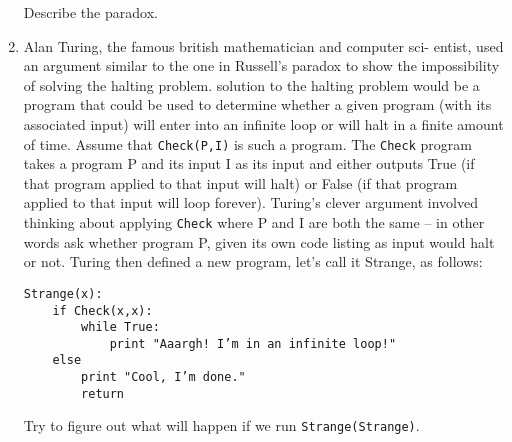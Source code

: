 \documentclass{amsart}
\begin{document}
\begin{enumerate}
Describe the paradox.

\vfill

\newpage

\item Alan Turing, the famous british mathematician and computer sci-
entist, used an argument similar to the one in Russell’s paradox to
show the impossibility of solving the halting problem. \A solution
to the halting problem would be a program that could be used to
determine whether a given program (with its associated input) will
enter into an infinite loop or will halt in a finite amount of time.
Assume that {\tt Check(P,I)} is such a program.  The {\tt Check} program
takes a program P and its input I as its input and either outputs
True (if that program applied to that input will halt) or False (if
that program applied to that input will loop forever).  Turing’s
clever argument involved thinking about applying {\tt Check} where P
and I are both the same – in other words ask whether program P,
given its own code listing as input would halt or not.
Turing then defined a new program, let’s call it Strange, as
follows:
\medskip

\begin{verbatim}
Strange(x):
    if Check(x,x):
        while True:
            print "Aaargh! I’m in an infinite loop!"
    else
        print "Cool, I’m done."
        return
\end{verbatim}
\medskip


Try to figure out what will happen if we run {\tt Strange(Strange)}.


\end{enumerate}
\end{document}
